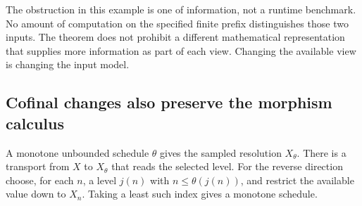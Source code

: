 The obstruction in this example is one of information, not a runtime benchmark. No amount of computation on the specified finite prefix distinguishes those two inputs. The theorem does not prohibit a different mathematical representation that supplies more information as part of each view. Changing the available view is changing the input model.

\subsection{Cofinal changes also preserve the morphism calculus}
A monotone unbounded schedule \(\theta\) gives the sampled resolution \(X_\theta\). There is a transport from \(X\) to \(X_\theta\) that reads the selected level. For the reverse direction choose, for each \(n\), a level \(j(n)\) with \(n\le\theta(j(n))\), and restrict the available value down to \(X_n\). Taking a least such index gives a monotone schedule.

